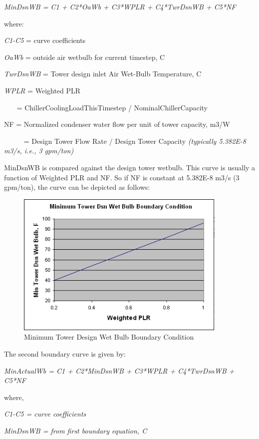 \emph{MinDsnWB = C1 + C2*OaWb + C3*WPLR + C4*TwrDsnWB + C5*NF}

where:

\emph{C1-C5} = curve coefficients

\emph{OaWb} = outside air wetbulb for current timestep, C

\emph{TwrDsnWB} = Tower design inlet Air Wet-Bulb Temperature, C

\emph{WPLR} = Weighted PLR

~~~ = ChillerCoolingLoadThisTimestep / NominalChillerCapacity

NF = Normalized condenser water flow per unit of tower capacity, m3/W

~~~~~ = Design Tower Flow Rate / Design Tower Capacity \emph{(typically 5.382E-8 m3/s, i.e., 3 gpm/ton)}

MinDsnWB is compared against the design tower wetbulb. This curve is usually a function of Weighted PLR and NF. So if NF is constant at 5.382E-8 m3/s (3 gpm/ton), the curve can be depicted as follows:

\begin{figure}[hbtp] %
\centering
\includegraphics[width=0.9\textwidth, height=0.9\textheight, keepaspectratio=true]{media/image6482.png}
\caption{Minimum Tower Design Wet Bulb Boundary Condition \protect \label{fig:minimum-tower-design-wet-bulb-boundary}}
\end{figure}

The second boundary curve is given by:

\emph{MinActualWb = C1 + C2*MinDsnWB + C3*WPLR + C4*TwrDsnWB + C5*NF}

where,

\emph{C1-C5 = curve coefficients}

\emph{MinDsnWB = from first boundary equation, C}

